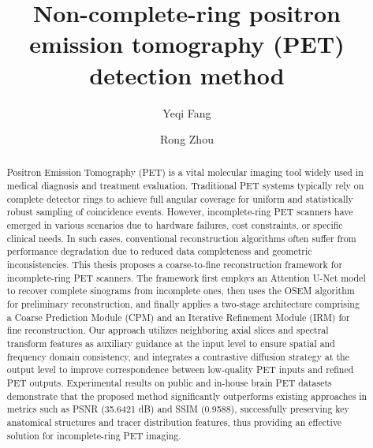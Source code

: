 \documentclass[
reprint,
superscriptaddress,
nofootinbib,
amsmath,amssymb,
aps,
prd,
]{revtex4-2}
\begin{document}

\title{Non-complete-ring positron emission tomography (PET) detection method}


\author{Yeqi Fang}

\author{Rong Zhou}



\begin{abstract}
	Positron Emission Tomography (PET) is a vital molecular imaging tool widely used in medical diagnosis and treatment evaluation. Traditional PET systems typically rely on complete detector rings to achieve full angular coverage for uniform and statistically robust sampling of coincidence events. However, incomplete-ring PET scanners have emerged in various scenarios due to hardware failures, cost constraints, or specific clinical needs. In such cases, conventional reconstruction algorithms often suffer from performance degradation due to reduced data completeness and geometric inconsistencies. This thesis proposes a coarse-to-fine reconstruction framework for incomplete-ring PET scanners. The framework first employs an Attention U-Net model to recover complete sinograms from incomplete ones, then uses the OSEM algorithm for preliminary reconstruction, and finally applies a two-stage architecture comprising a Coarse Prediction Module (CPM) and an Iterative Refinement Module (IRM) for fine reconstruction. Our approach utilizes neighboring axial slices and spectral transform features as auxiliary guidance at the input level to ensure spatial and frequency domain consistency, and integrates a contrastive diffusion strategy at the output level to improve correspondence between low-quality PET inputs and refined PET outputs. Experimental results on public and in-house brain PET datasets demonstrate that the proposed method significantly outperforms existing approaches in metrics such as PSNR (35.6421 dB) and SSIM (0.9588), successfully preserving key anatomical structures and tracer distribution features, thus providing an effective solution for incomplete-ring PET imaging.
\end{abstract}
\maketitle
\end{document}
